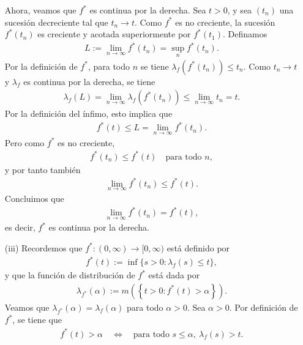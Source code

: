 \begin{homeworkProblem}
\begin{solution}
\begin{itemize}
        Ahora, veamos que $f^*$ es continua por la derecha. Sea $t > 0$, y sea $(t_n)$ una sucesión decreciente tal que $t_n \to t$. Como $f^*$ es no creciente, la sucesión $f^*(t_n)$ es creciente y acotada superiormente por $f^*(t_1)$. Definamos
        \begin{align*}
          L := \lim_{n \to \infty} f^*(t_n) = \sup_n f^*(t_n).
        \end{align*}
        Por la definición de $f^*$, para todo $n$ se tiene $\lambda_f(f^*(t_n)) \leq t_n$. Como $t_n \to t$ y $\lambda_f$ es continua por la derecha, se tiene
        \begin{align*}
          \lambda_f(L) = \lim_{n \to \infty} \lambda_f(f^*(t_n)) \leq \lim_{n \to \infty} t_n = t.
        \end{align*}
        Por la definición del ínfimo, esto implica que
        \begin{align*}
          f^*(t) \leq L = \lim_{n \to \infty} f^*(t_n).
        \end{align*}
        Pero como $f^*$ es no creciente,
        \begin{align*}
          f^*(t_n) \leq f^*(t) \quad \text{para todo } n,
        \end{align*}
        y por tanto también
        \begin{align*}
          \lim_{n \to \infty} f^*(t_n) \leq f^*(t).
        \end{align*}
        Concluimos que
        \begin{align*}
          \lim_{n \to \infty} f^*(t_n) = f^*(t),
        \end{align*}
        es decir, $f^*$ es continua por la derecha.
      \item[(iii)] Recordemos que $f^* : (0,\infty) \to [0,\infty)$ está definido por
        \begin{align*}
          f^*(t) := \inf\{ s > 0 : \lambda_f(s) \leq t \},
        \end{align*}
        y que la función de distribución de $f^*$ está dada por
        \begin{align*}
          \lambda_{f^*}(\alpha) := m\left( \left\{ t > 0 : f^*(t) > \alpha \right\} \right).
        \end{align*}
        Veamos que $\lambda_{f^*}(\alpha) = \lambda_f(\alpha)$ para todo $\alpha > 0$. 
        Sea $\alpha > 0$. Por definición de $f^*$, se tiene que
        \begin{align*}
          f^*(t) > \alpha \quad \Leftrightarrow \quad \text{para todo } s \leq \alpha,\ \lambda_f(s) > t.

\end{align*}
\end{itemize}
\end{solution}
\end{homeworkProblem}
